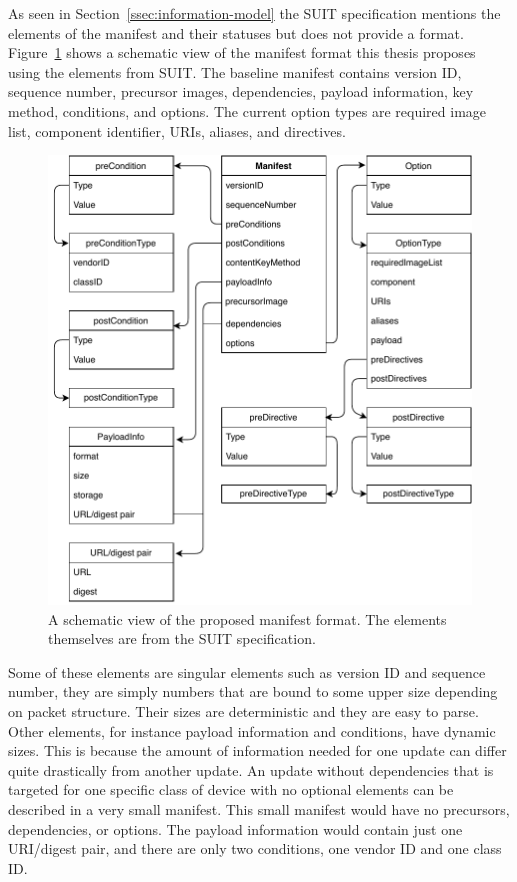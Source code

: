 \documentclass[0-thesis.tex]{subfiles}
\begin{document}
As seen in Section~\ref{ssec:information-model} the SUIT specification mentions the
elements of the manifest and their statuses but does not provide a format.
Figure~\ref{fig:manifest-format} shows a schematic view of the manifest format this thesis
proposes using the elements from SUIT. The baseline manifest contains version ID, sequence
number, precursor images, dependencies, payload information, key method, conditions, and
options. The current option types are required image list, component identifier, URIs,
aliases, and directives.

\begin{figure}
    \caption{A schematic view of the proposed manifest format. The elements themselves are from the SUIT specification.}
    \label{fig:manifest-format}
    \includegraphics{images/manifest-format.pdf}
\end{figure}

Some of these elements are singular elements such as version ID and sequence number, they
are simply numbers that are bound to some upper size depending on packet structure. Their
sizes are deterministic and they are easy to parse. Other elements, for instance payload
information and conditions, have dynamic sizes. This is because the amount of information
needed for one update can differ quite drastically from another update. An update without
dependencies that is targeted for one specific class of device with no optional elements
can be described in a very small manifest. This small manifest would have no precursors,
dependencies, or options. The payload information would contain just one URI/digest pair,
and there are only two conditions, one vendor ID and one class ID.
\end{document}
